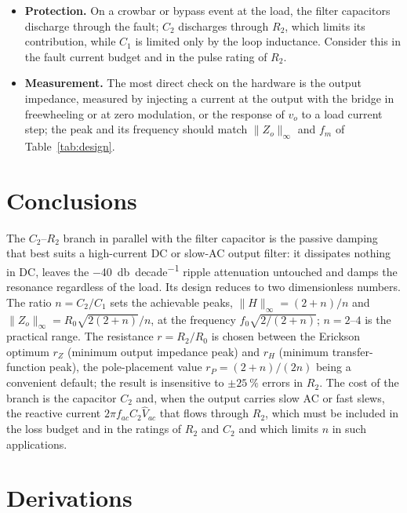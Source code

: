 \documentclass[11pt,a4paper]{article}
\begin{document}
\begin{itemize}[leftmargin=*]
      lower.
\item \textbf{Protection.} On a crowbar or bypass event at the load, the filter capacitors
      discharge through the fault; $C_2$ discharges through $R_2$, which limits its
      contribution, while $C_1$ is limited only by the loop inductance. Consider this in
      the fault current budget and in the pulse rating of $R_2$.
\item \textbf{Measurement.} The most direct check on the hardware is the output impedance,
      measured by injecting a current at the output with the bridge in freewheeling or
      at zero modulation, or the response of $v_o$ to a load current step; the peak and
      its frequency should match $\|Z_o\|_\infty$ and $f_m$ of Table~\ref{tab:design}.
\end{itemize}

\section{Conclusions}

The $C_2$--$R_2$ branch in parallel with the filter capacitor is the passive damping
that best suits a high-current DC or slow-AC output filter: it dissipates nothing in DC,
leaves the \SI{-40}{\decibel\per decade} ripple attenuation untouched and damps the
resonance regardless of the load. Its design reduces to two dimensionless numbers. The
ratio $n = C_2/C_1$ sets the achievable peaks, $\|H\|_\infty = (2+n)/n$ and
$\|Z_o\|_\infty = R_0\sqrt{2(2+n)}/n$, at the frequency $f_0\sqrt{2/(2+n)}$; $n = 2$--$4$
is the practical range. The resistance $r = R_2/R_0$ is chosen between the Erickson
optimum $r_Z$ (minimum output impedance peak) and $r_H$ (minimum transfer-function peak),
the pole-placement value $r_P = (2+n)/(2n)$ being a convenient default; the result is
insensitive to $\pm\SI{25}{\percent}$ errors in $R_2$. The cost of the branch is the
capacitor $C_2$ and, when the output carries slow AC or fast slews, the reactive current
$2\pi f_{ac} C_2 \hat V_{ac}$ that flows through $R_2$, which must be included in the loss
budget and in the ratings of $R_2$ and $C_2$ and which limits $n$ in such applications.

\appendix

\section{Derivations}
\label{app:deriv}
\end{document}
